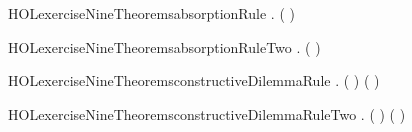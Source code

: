 \newcommand{\HOLexerciseNineDate}{22 March 2020}
\newcommand{\HOLexerciseNineTime}{15:39}
\begin{SaveVerbatim}{HOLexerciseNineTheoremsabsorptionRule}
\HOLTokenTurnstile{} \HOLSymConst{\HOLTokenForall{}} . ( \HOLSymConst{\HOLTokenImp{}} ) \HOLSymConst{\HOLTokenImp{}}  \HOLSymConst{\HOLTokenImp{}}  \HOLSymConst{\HOLTokenConj{}} 
\end{SaveVerbatim}
\newcommand{\HOLexerciseNineTheoremsabsorptionRule}{\UseVerbatim{HOLexerciseNineTheoremsabsorptionRule}}
\begin{SaveVerbatim}{HOLexerciseNineTheoremsabsorptionRuleTwo}
\HOLTokenTurnstile{} \HOLSymConst{\HOLTokenForall{}} . ( \HOLSymConst{\HOLTokenImp{}} ) \HOLSymConst{\HOLTokenImp{}}  \HOLSymConst{\HOLTokenImp{}}  \HOLSymConst{\HOLTokenConj{}} 
\end{SaveVerbatim}
\newcommand{\HOLexerciseNineTheoremsabsorptionRuleTwo}{\UseVerbatim{HOLexerciseNineTheoremsabsorptionRuleTwo}}
\begin{SaveVerbatim}{HOLexerciseNineTheoremsconstructiveDilemmaRule}
\HOLTokenTurnstile{} \HOLSymConst{\HOLTokenForall{}}   . ( \HOLSymConst{\HOLTokenImp{}} ) \HOLSymConst{\HOLTokenConj{}} ( \HOLSymConst{\HOLTokenImp{}} ) \HOLSymConst{\HOLTokenImp{}}  \HOLSymConst{\HOLTokenDisj{}}  \HOLSymConst{\HOLTokenImp{}}  \HOLSymConst{\HOLTokenDisj{}} 
\end{SaveVerbatim}
\newcommand{\HOLexerciseNineTheoremsconstructiveDilemmaRule}{\UseVerbatim{HOLexerciseNineTheoremsconstructiveDilemmaRule}}
\begin{SaveVerbatim}{HOLexerciseNineTheoremsconstructiveDilemmaRuleTwo}
\HOLTokenTurnstile{} \HOLSymConst{\HOLTokenForall{}}   . ( \HOLSymConst{\HOLTokenImp{}} ) \HOLSymConst{\HOLTokenConj{}} ( \HOLSymConst{\HOLTokenImp{}} ) \HOLSymConst{\HOLTokenImp{}}  \HOLSymConst{\HOLTokenImp{}}  \HOLSymConst{\HOLTokenConj{}} 
\end{SaveVerbatim}
\newcommand{\HOLexerciseNineTheoremsconstructiveDilemmaRuleTwo}{\UseVerbatim{HOLexerciseNineTheoremsconstructiveDilemmaRuleTwo}}
\newcommand{\HOLexerciseNineTheorems}{
\HOLThmTag{exercise9}{absorptionRule}\HOLexerciseNineTheoremsabsorptionRule
\HOLThmTag{exercise9}{absorptionRule2}\HOLexerciseNineTheoremsabsorptionRuleTwo
\HOLThmTag{exercise9}{constructiveDilemmaRule}\HOLexerciseNineTheoremsconstructiveDilemmaRule
\HOLThmTag{exercise9}{constructiveDilemmaRule2}\HOLexerciseNineTheoremsconstructiveDilemmaRuleTwo
}
